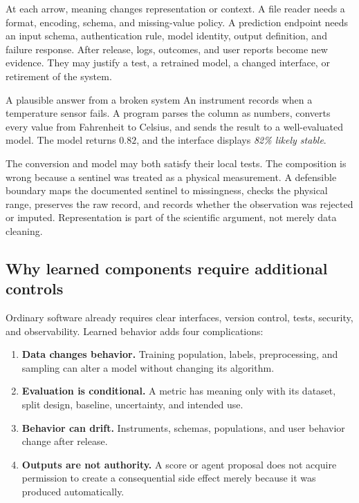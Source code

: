 At each arrow, meaning changes representation or context. A file reader needs a
format, encoding, schema, and missing-value policy. A prediction endpoint needs
an input schema, authentication rule, model identity, output definition, and
failure response. After release, logs, outcomes, and user reports become new
evidence. They may justify a test, a retrained model, a changed interface, or
retirement of the system.

\begin{workedexample}{A plausible answer from a broken system}
An instrument records  when a temperature sensor fails. A program
parses the column as numbers, converts every value from Fahrenheit to Celsius,
and sends the result to a well-evaluated model. The model returns \(0.82\), and
the interface displays \emph{82\% likely stable}.

The conversion and model may both satisfy their local tests. The composition is
wrong because a sentinel was treated as a physical measurement. A defensible
boundary maps the documented sentinel to missingness, checks the physical
range, preserves the raw record, and records whether the observation was
rejected or imputed. Representation is part of the scientific argument, not
merely data cleaning.
\end{workedexample}

\subsection{Why learned components require additional controls}

Ordinary software already requires clear interfaces, version control, tests,
security, and observability. Learned behavior adds four complications:

\begin{enumerate}
  \item \textbf{Data changes behavior.} Training population, labels,
  preprocessing, and sampling can alter a model without changing its algorithm.
  \item \textbf{Evaluation is conditional.} A metric has meaning only with its
  dataset, split design, baseline, uncertainty, and intended use.
  \item \textbf{Behavior can drift.} Instruments, schemas, populations, and
  user behavior change after release.
  \item \textbf{Outputs are not authority.} A score or agent proposal does not
  acquire permission to create a consequential side effect merely because it
  was produced automatically.
\end{enumerate}

